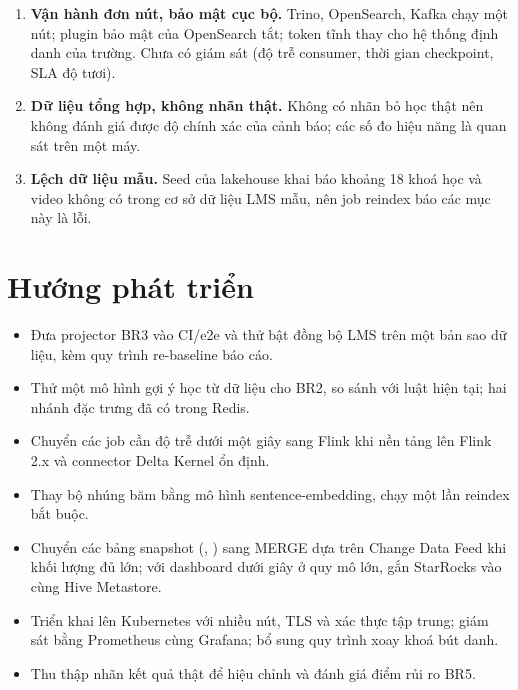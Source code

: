 \begin{enumerate}
  \item \textbf{Vận hành đơn nút, bảo mật cục bộ.} Trino, OpenSearch, Kafka chạy một nút; plugin bảo mật của OpenSearch tắt; token tĩnh thay cho hệ thống định danh của trường. Chưa có giám sát (độ trễ consumer, thời gian checkpoint, SLA độ tươi).
  \item \textbf{Dữ liệu tổng hợp, không nhãn thật.} Không có nhãn bỏ học thật nên không đánh giá được độ chính xác của cảnh báo; các số đo hiệu năng là quan sát trên một máy.
  \item \textbf{Lệch dữ liệu mẫu.} Seed của lakehouse khai báo khoảng 18 khoá học và video không có trong cơ sở dữ liệu LMS mẫu, nên job reindex báo các mục này là lỗi.
\end{enumerate}

\section{Hướng phát triển}

\begin{itemize}
  \item Đưa projector BR3 vào CI/e2e và thử bật đồng bộ LMS trên một bản sao dữ liệu, kèm quy trình re-baseline báo cáo.
  \item Thử một mô hình gợi ý học từ dữ liệu cho BR2, so sánh với luật hiện tại; hai nhánh đặc trưng đã có trong Redis.
  \item Chuyển các job cần độ trễ dưới một giây sang Flink khi nền tảng lên Flink 2.x và connector Delta Kernel ổn định.
  \item Thay bộ nhúng băm bằng mô hình sentence-embedding, chạy một lần reindex bắt buộc.
  \item Chuyển các bảng snapshot (, ) sang MERGE dựa trên Change Data Feed khi khối lượng đủ lớn; với dashboard dưới giây ở quy mô lớn, gắn StarRocks vào cùng Hive Metastore.
  \item Triển khai lên Kubernetes với nhiều nút, TLS và xác thực tập trung; giám sát bằng Prometheus cùng Grafana; bổ sung quy trình xoay khoá bút danh.
  \item Thu thập nhãn kết quả thật để hiệu chỉnh và đánh giá điểm rủi ro BR5.
\end{itemize}
